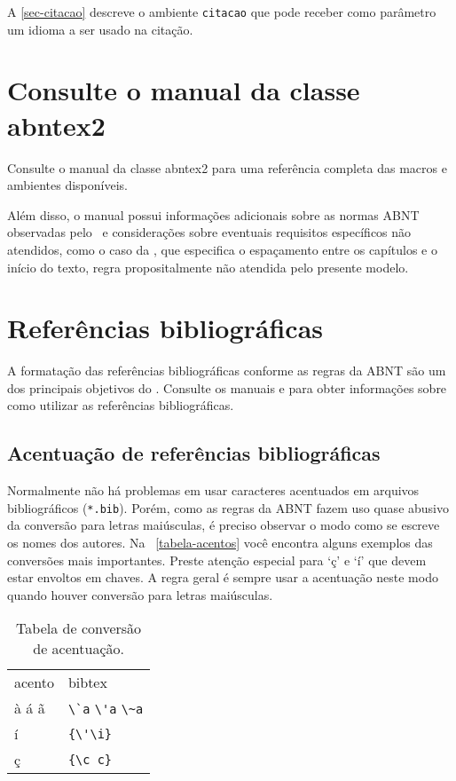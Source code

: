 A \autoref{sec-citacao} descreve o ambiente \texttt{citacao} que pode receber como parâmetro um idioma a ser usado na citação.

\section{Consulte o manual da classe \textsf{abntex2}}
Consulte o manual da classe \textsf{abntex2} \cite{abntex2classe} para uma referência completa das macros e ambientes disponíveis. 

Além disso, o manual possui informações adicionais sobre as normas ABNT observadas pelo \abnTeX\ e considerações sobre eventuais requisitos específicos não atendidos, como o caso da , que especifica o espaçamento entre os capítulos e o início do texto, regra propositalmente não atendida pelo presente modelo.

\section{Referências bibliográficas}
A formatação das referências bibliográficas conforme as regras da ABNT são um dos principais objetivos do \abnTeX. Consulte os manuais  e  para obter informações sobre como utilizar as referências bibliográficas.

\subsection{Acentuação de referências bibliográficas}
Normalmente não há problemas em usar caracteres acentuados em arquivos bibliográficos (\texttt{*.bib}). Porém, como as regras da ABNT fazem uso quase abusivo da conversão para letras maiúsculas, é preciso observar o modo como se escreve os nomes dos autores. Na ~\autoref{tabela-acentos} você encontra alguns exemplos das conversões mais importantes. Preste atenção especial para `ç' e `í' que devem estar envoltos em chaves. A regra geral é sempre usar a acentuação neste modo quando houver conversão para letras maiúsculas.

\begin{table}[htbp]
  \caption{Tabela de conversão de acentuação.}
  \label{tabela-acentos}
  \begin{center}
    \begin{tabular}{ll}\hline\hline
      acento & \textsf{bibtex}\\
      à á ã & \verb+\`a+ \verb+\'a+ \verb+\~a+\\
      í & \verb+{\'\i}+\\
      ç & \verb+{\c c}+\\
      \hline\hline
    \end{tabular}
  \end{center}
\end{table}

